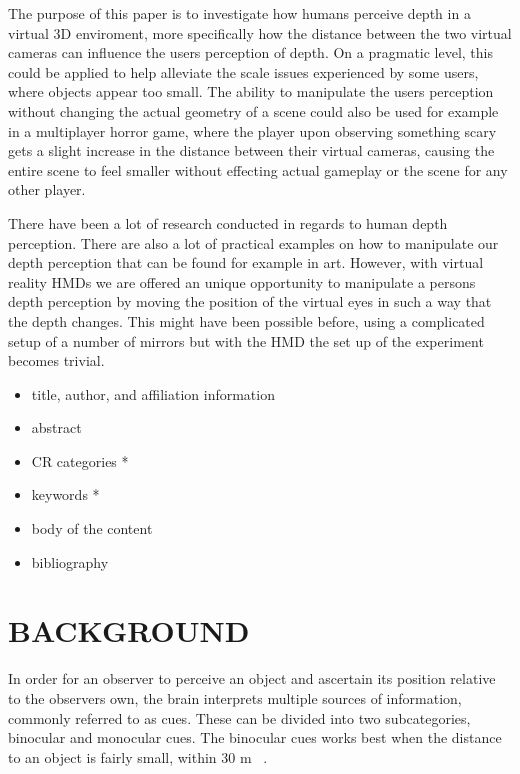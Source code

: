 \documentclass[tog]{acmsiggraph}
\begin{document}
The purpose of this paper is to investigate how humans perceive depth in a virtual 3D enviroment, more specifically how the distance between the two virtual cameras can influence the users perception of depth. On a pragmatic level, this could be applied to help alleviate the scale issues experienced by some users, where objects appear too small. The ability to manipulate the users perception without changing the actual geometry of a scene could also be used for example in a multiplayer horror game, where the player upon observing something scary gets a slight increase in the distance between their virtual cameras, causing the entire scene to feel smaller without effecting actual gameplay or the scene for any other player.    

There have been a lot of research conducted in regards to human depth perception. There are also a lot of practical examples on how to manipulate our depth perception that can be found for example in art. However, with virtual reality HMDs we are offered an unique opportunity to manipulate a persons depth perception by moving the position of the virtual eyes in such a way that the depth changes. This might have been possible before, using a complicated setup of a number of mirrors but with the HMD the set up of the experiment becomes trivial.  

\begin{itemize}
\item title, author, and affiliation information
\item abstract
\item CR categories *
\item keywords *
\item body of the content
\item bibliography
\end{itemize}



\section{BACKGROUND}

In order for an observer to perceive an object and ascertain its position relative to the observers own, the brain interprets multiple sources of information, commonly referred to as cues. 
These can be divided into two subcategories, binocular and monocular cues. The binocular cues works best when the distance to an object is fairly small, within 30 m ~\cite {Palvqvist:2013:DPDS}.
\end{document}
